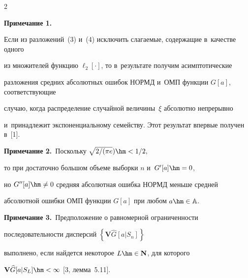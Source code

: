 \begin{multicols}{2}
\noindent


\textbf{Примечание 1.}\ 


Если из разложений~(3) и~(4) исключить слагаемые, содержащие в~качестве одного 


из множителей функцию $\ell_2[\cdot]$, то в~результате получим асимптотические 


разложения средних абсолютных ошибок НОРМД и~ОМП функции $G[a]$, соответствующие 


случаю, когда распределение случайной величины~$\xi$ абсолютно непрерывно 


и~принадлежит экспоненциальному семейству. Этот результат впервые получен в~[1].










\noindent


\textbf{Примечание 2.}\ Поскольку $\sqrt{{2}/({\pi e}})\hm< {1}/{2},$


 то при достаточно большом объеме выборки $n$ и~$G'[a]\hm=0$,\linebreak\vspace*{-12pt}


 


 \pagebreak


 


 \noindent 


 но $G''[a]\hm\neq 0$ средняя абсолютная ошибка НОРМД меньше средней 


 абсолютной ошибки ОМП функции $G[a]$  при любом $a\hm\in {\mathbb A}$.





\smallskip





\noindent


\textbf{Примечание 3.}\ Предположение о равномерной ограниченности 


последовательности дисперсий $\left\{\mathbf{V} \widehat{G}[a|S_n]\right\}$


 выполнено, если найдется некоторое $L\hm\in \mathbf{N}$, для которого


 $\mathbf{V} \widehat{G}[a|S_L]\hm<\infty$ [3, лемма~5.11].






\end{multicols}
